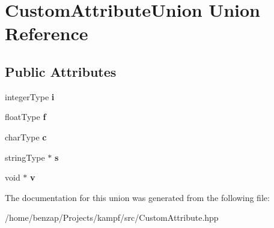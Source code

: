 \hypertarget{unionCustomAttributeUnion}{\section{Custom\-Attribute\-Union Union Reference}
\label{unionCustomAttributeUnion}
}
\subsection*{Public Attributes}
\begin{DoxyCompactItemize}
\item 
\hypertarget{unionCustomAttributeUnion_af048e2b557849c66b26c3754f1b82d3f}{integer\-Type {\bfseries i}}\label{unionCustomAttributeUnion_af048e2b557849c66b26c3754f1b82d3f}

\item 
\hypertarget{unionCustomAttributeUnion_a8c16a3614ffc21d369e9a79eb1b04e70}{float\-Type {\bfseries f}}\label{unionCustomAttributeUnion_a8c16a3614ffc21d369e9a79eb1b04e70}

\item 
\hypertarget{unionCustomAttributeUnion_a1963549277417ac9c5e697cd3b2ebd9c}{char\-Type {\bfseries c}}\label{unionCustomAttributeUnion_a1963549277417ac9c5e697cd3b2ebd9c}

\item 
\hypertarget{unionCustomAttributeUnion_a3708912bac1c4441ec77c020273334a2}{string\-Type $\ast$ {\bfseries s}}\label{unionCustomAttributeUnion_a3708912bac1c4441ec77c020273334a2}

\item 
\hypertarget{unionCustomAttributeUnion_a0237b60468226d1d058a370a7f41d466}{void $\ast$ {\bfseries v}}\label{unionCustomAttributeUnion_a0237b60468226d1d058a370a7f41d466}

\end{DoxyCompactItemize}


The documentation for this union was generated from the following file\-:\begin{DoxyCompactItemize}
\item 
/home/benzap/\-Projects/kampf/src/Custom\-Attribute.\-hpp\end{DoxyCompactItemize}
